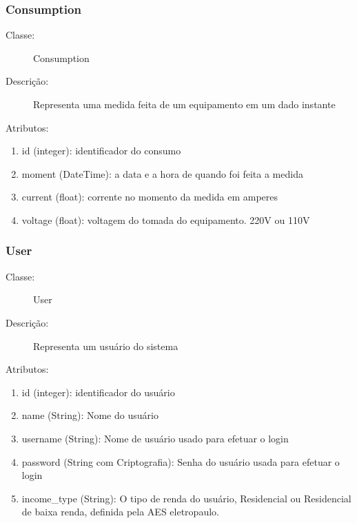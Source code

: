 \subsubsection{Consumption}
\begin{description}
	\item[Classe:] Consumption
	\item[Descrição:] Representa uma medida feita de um equipamento em um dado instante
	\item[Atributos:]
\end{description} 
\begin{enumerate}
	\item id (integer): identificador do consumo
	\item moment (DateTime): a data e a hora de quando foi feita a medida
	\item current (float): corrente no momento da medida em amperes
	\item voltage (float): voltagem do tomada do equipamento. 220V ou 110V
\end{enumerate}
%
\subsubsection{User}
\begin{description}
	\item[Classe:] User
	\item[Descrição:] Representa um usuário do sistema
	\item[Atributos:]
\end{description} 
\begin{enumerate}
	\item id (integer): identificador do usuário
	\item name (String):  Nome do usuário
	\item username (String): Nome de usuário usado para efetuar o login
	\item password (String com Criptografia): Senha do usuário usada para efetuar o login
    \item income\_type (String): O tipo de renda do usuário, Residencial ou Residencial de baixa renda, definida pela AES eletropaulo.
\end{enumerate}
%
